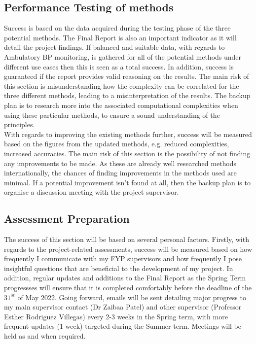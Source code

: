 \documentclass[11pt, a4paper]{article}
\begin{document}
\subsection{Performance Testing of methods}
Success is based on the data acquired during the testing phase of the three potential methods. The Final Report is also an important indicator as it will detail the project findings. If balanced and suitable data, with regards to Ambulatory BP monitoring, is gathered for all of the potential methods under different use cases then this is seen as a total success. In addition, success is guaranteed if the report provides valid reasoning on the results. The main risk of this section is misunderstanding how the complexity can be correlated for the three different methods, leading to a misinterpretation of the results. The backup plan is to research more into the associated computational complexities when using these particular methods, to ensure a sound understanding of the principles. \\ \newline \noindent With regards to improving the existing methods further, success will be measured based on the figures from the updated methods, e.g. reduced complexities, increased accuracies. The main risk of this section is the possibility of not finding any improvements to be made. As these are already well researched methods internationally, the chances of finding improvements in the methods used are minimal. If a potential improvement isn’t found at all, then the backup plan is to organise a discussion meeting with the project supervisor.


\subsection{Assessment Preparation}
The success of this section will be based on several personal factors. Firstly, with regards to the project-related assessments, success will be measured based on how frequently I communicate with my FYP supervisors and how frequently I pose insightful questions that are beneficial to the development of my project. In addition, regular updates and additions to the Final Report as the Spring Term progressses will ensure that it is completed comfortably before the deadline of the $31^{st}$ of May 2022. Going forward, emails will be sent detailing major progress to my main supervisor contact (Dr Zaibaa Patel) and other supervisor (Professor Esther Rodriguez Villegas) every 2-3 weeks in the Spring term, with more frequent updates (1 week) targeted during the Summer term. Meetings will be held as and when required.
\end{document}
